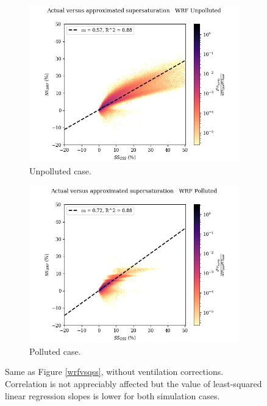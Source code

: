 \documentclass{article}
\begin{document}
\begin{figure}[ht]
	\centering
	\begin{subfigure}{0.7\textwidth}
		\includegraphics[width=\textwidth]{wrf/novent_heatmap_ss_qss_vs_ss_wrf_Unpolluted_figure.png}
		\caption{Unpolluted case.}
		\label{noventwrfvsqssunpoll}
	\end{subfigure}
	\begin{subfigure}{0.7\textwidth}
		\includegraphics[width=\textwidth]{wrf/novent_heatmap_ss_qss_vs_ss_wrf_Polluted_figure.png}
		\caption{Polluted case.}
		\label{noventwrfvsqsspoll}
	\end{subfigure}
	\caption{Same as Figure \ref{wrfvsqss}, without ventilation corrections. Correlation is not appreciably affected but the value of least-squared linear regression slopes is lower for both simulation cases.}
	\label{noventwrfvsqss}
\end{figure}
\end{document}
